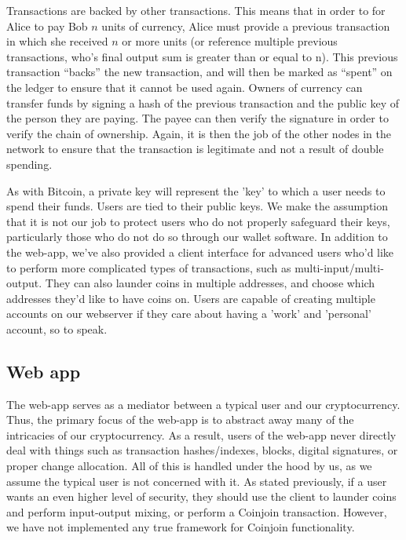 \documentclass[12pt]{article}
\begin{document}
Transactions are backed by other transactions. This means that in order to for Alice to pay Bob $n$ units of currency, Alice must provide a previous transaction in which she received $n$ or more units (or reference multiple previous transactions, who's final output sum is greater than or equal to n). This previous transaction ``backs'' the new transaction, and will then be marked as ``spent'' on the ledger to ensure that it cannot be used again. Owners of currency can transfer funds by signing a hash of the previous transaction and the public key of the person they are paying. The payee can then verify the signature in order to verify the chain of ownership. Again, it is then the job of the other nodes in the network to ensure that the transaction is legitimate and not a result of double spending.

As with Bitcoin, a private key will represent the 'key' to which a user needs to spend their funds. Users are tied to their public keys. We make the assumption that it is not our job to protect users who do not properly safeguard their keys, particularly those who do not do so through our wallet software. In addition to the web-app, we've also provided a client interface for advanced users who'd like to perform more complicated types of transactions, such as multi-input/multi-output. They can also launder coins in multiple addresses, and choose which addresses they'd like to have coins on. Users are capable of creating multiple accounts on our webserver if they care about having a 'work' and 'personal' account, so to speak.

\subsection*{Web app}

The web-app serves as a mediator between a typical user and our cryptocurrency. Thus, the primary focus of the web-app is to abstract away many of the intricacies of our cryptocurrency. As a result, users of the web-app never directly deal with things such as transaction hashes/indexes, blocks, digital signatures, or proper change allocation. All of this is handled under the hood by us, as we assume the typical user is not concerned with it. As stated previously, if a user wants an even higher level of security, they should use the client to launder coins and perform input-output mixing, or perform a Coinjoin transaction. However, we have not implemented any true framework for Coinjoin functionality.
\end{document}
